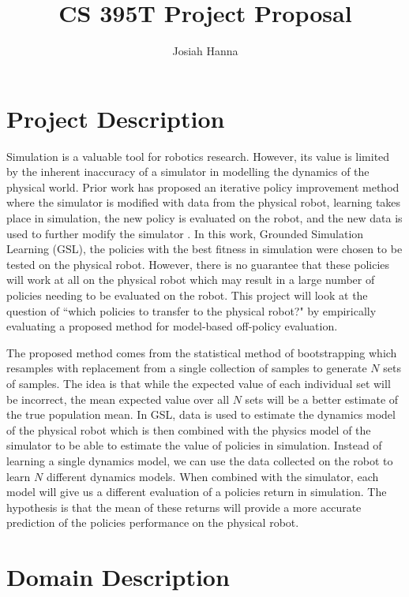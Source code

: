\documentclass[12 pt]{article}
\author{Josiah Hanna}
\title{CS 395T Project Proposal}
\begin{document}

\section{Project Description}

Simulation is a valuable tool for robotics research. However, its value is limited by the inherent inaccuracy of a simulator in modelling the dynamics of the physical world. Prior work has proposed an iterative policy improvement method where the simulator is modified with data from the physical robot, learning takes place in simulation, the new policy is evaluated on the robot, and the new data is used to further modify the simulator \cite{farchy2013humanoid}. In this work, Grounded Simulation Learning (GSL), the policies with the best fitness in simulation were chosen to be tested on the physical robot. However, there is no guarantee that these policies will work at all on the physical robot which may result in a large number of policies needing to be evaluated on the robot. This project will look at the question of ``which policies to transfer to the physical robot?" by empirically evaluating a proposed method for model-based off-policy evaluation.

The proposed method comes from the statistical method of bootstrapping which resamples with replacement from a single collection of samples to generate $N$ sets of samples. The idea is that while the expected value of each individual set will be incorrect, the mean expected value over all $N$ sets will be a better estimate of the true population mean. In GSL, data is used to estimate the dynamics model of the physical robot which is then combined with the physics model of the simulator to be able to estimate the value of policies in simulation. Instead of learning a single dynamics model, we can use the data collected on the robot to learn $N$ different dynamics models. When combined with the simulator, each model will give us a different evaluation of a policies return in simulation. The hypothesis is that the mean of these returns will provide a more accurate prediction of the policies performance on the physical robot.


\section{Domain Description}
\end{document}
